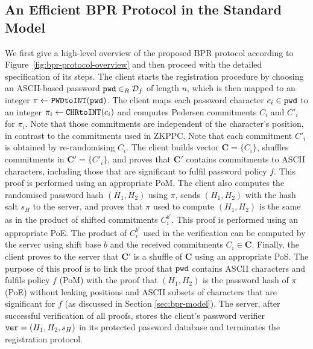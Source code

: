 
\subsection{An Efficient BPR Protocol in the Standard Model} \label{sec:construction}


We first give a high-level overview of the proposed \ac{BPR} protocol according to Figure~\ref{fig:bpr-protocol-overview} and then proceed with the detailed specification of its steps. The client starts the registration procedure by choosing an ASCII-based password $\mathtt{pwd}\in_R\mathcal{D}_f$ of length $n$, which is then mapped to an integer $\pi\gets\texttt{PWDtoINT}(\mathtt{pwd})$.
The client maps each password character $c_i\in\mathtt{pwd}$ to an integer $\pi_i\gets\texttt{CHRtoINT}(c_i)$ and computes Pedersen commitments $C_i$ and $C'_i$ for $\pi_i$. 
Note that those commitments are independent of the character's position, in contrast to the commitments used in \ac{ZKPPC}.
Note that each commitment $C'_i$ is obtained by re-randomising $C_i$. 
The client builds vector $\bm{C}=\{C_i\}$, shuffles commitments in $\bm{C'}=\{C'_i\}$, and proves that $\bm C'$ contains commitments to ASCII characters, including those that are significant to fulfil password policy $f$. 
This proof is performed using an appropriate \ac{PoM}.
The client also computes the randomised password hash $(H_1, H_2)$ using $\pi$, sends $(H_1, H_2)$ with the hash salt $s_H$ to the server, and proves that $\pi$ used to compute $(H_1, H_2)$ is the same as in the product of shifted commitments $C^{{b^i}}_i$. 
This proof is performed using an appropriate \ac{PoE}.
The product of $C^{b^i}_i$ used in the verification can be computed by the server using shift base $b$ and the received commitments $C_i\in \bm C$.
Finally, the client proves to the server that $\bm C'$ is a shuffle of $\bm C$ using an appropriate \ac{PoS}. 
The purpose of this proof is to link the proof that $\mathtt{pwd}$ contains \ac{ASCII} characters and fulfils policy $f$ (\ac{PoM}) with the proof that $(H_1, H_2)$ is the password hash of $\pi$ (\ac{PoE}) without leaking positions and ASCII subsets of characters that are significant for $f$ (as discussed in Section \ref{sec:bpr-model}). 
The server, after successful verification of all proofs, stores the client's password verifier $\mathtt{ver} = (H_1,H_2,s_H)$ in its protected password database and terminates the registration protocol. 
